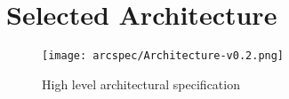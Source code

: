 \section{Selected Architecture}\label{sec:selected-architecture}

\begin{figure}[H]
    \centering
    \texttt{[image: arcspec/Architecture-v0.2.png]}
    \caption{High level architectural specification}
    \label{fig:general-architecture}
\end{figure}